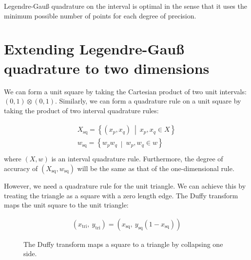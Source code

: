 \documentclass{book}
\begin{document}
Legendre-Gauß quadrature on the interval is optimal in the sense that it uses the
minimum possible number of points for each degree of precision.


\section{Extending Legendre-Gauß quadrature to two dimensions}
\label{\detokenize{1_quadrature:extending-legendre-gausz-quadrature-to-two-dimensions}}
We can form a unit square by taking the Cartesian product of two unit
intervals: \((0, 1)\otimes (0, 1)\). Similarly, we can form a quadrature
rule on a unit square by taking the product of two interval quadrature
rules:

\label{\detokenize{1_quadrature:equation-squarequad}}\begin{align}\label{equation:1_quadrature:squarequad}\!\begin{aligned}
X_\textrm{sq} = \left\{ (x_p, x_q)\ \middle|\ x_p, x_q \in X \right\}\\
w_\textrm{sq} = \left\{ w_p w_q\ \middle|\ w_p, w_q \in w \right\}\\
\end{aligned}\end{align}
where \((X, w)\) is an interval quadrature rule. Furthermore, the degree
of accuracy of \((X_\textrm{sq}, w_\textrm{sq})\) will be the same as
that of the one-dimensional rule.

However, we need a quadrature rule for the unit triangle. We can
achieve this by treating the triangle as a square with a zero length
edge. The Duffy transform maps the unit square to the unit triangle:

\label{\detokenize{1_quadrature:equation-1_quadrature:4}}\begin{equation}\label{equation:1_quadrature:1_quadrature:4}
\begin{split}(x_\textrm{tri},\ y_\textrm{tri}) =
  \left(x_\textrm{sq},\ y_\textrm{sq}(1 - x_\textrm{sq})\right)\end{split}
\end{equation}
\begin{figure}[htbp]
\centering
\capstart

\noindent{}
\caption{The Duffy transform maps a square to a triangle by collapsing one side.}\label{\detokenize{1_quadrature:figduffy}}\label{\detokenize{1_quadrature:id1}}\end{figure}
\end{document}
